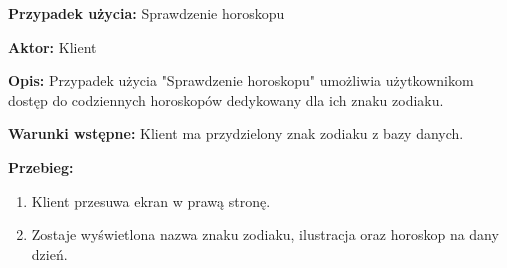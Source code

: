 \textbf{Przypadek użycia:} Sprawdzenie horoskopu

\textbf{Aktor:} Klient

\textbf{Opis:} Przypadek użycia "Sprawdzenie horoskopu" umożliwia użytkownikom dostęp do
codziennych horoskopów dedykowany dla ich znaku zodiaku.

\textbf{Warunki wstępne:} Klient ma przydzielony znak zodiaku z bazy danych.

\textbf{Przebieg:}
\begin{enumerate}
	\item Klient przesuwa ekran w prawą stronę.
	\item Zostaje wyświetlona nazwa znaku zodiaku, ilustracja oraz horoskop na dany dzień.
\end{enumerate}
